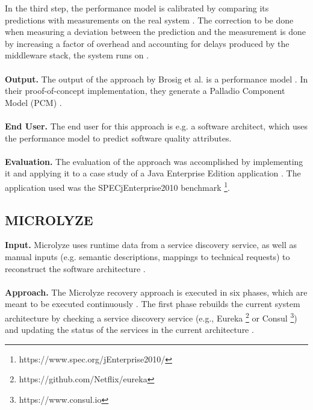 In the third step, the performance model is calibrated by comparing its predictions with measurements on the real system \cite{Brosig2011}.
The correction to be done when measuring a deviation between the prediction and the measurement is done by increasing a factor of overhead and accounting for delays produced by the middleware stack, the system runs on \cite{Brosig2011}.
\\ \\
\textbf{Output.}
The output of the approach by Brosig et al. is a performance model \cite{Brosig2011}.
In their proof-of-concept implementation, they generate a Palladio Component Model (PCM) \cite{Brosig2011}.
\\ \\
\textbf{End User.}
The end user for this approach is e.g. a software architect, which uses the performance model to predict software quality attributes.
\\ \\
\textbf{Evaluation.}
The evaluation of the approach was accomplished by implementing it and applying it to a case study of a Java Enterprise Edition application \cite{Brosig2011}.
The application used was the SPECjEnterprise2010 benchmark \footnote{https://www.spec.org/jEnterprise2010/}.


\subsection{MICROLYZE \cite{Kleehaus2018}}
\label{sec:Results:Microlyze}
\textbf{Input.}
Microlyze uses runtime data from a service discovery service, as well as manual inputs (e.g. semantic descriptions, mappings to technical requests) to reconstruct the software architecture \cite{Kleehaus2018}.
\\ \\
\textbf{Approach.}
The Microlyze recovery approach is executed in six phases, which are meant to be executed continuously \cite{Kleehaus2018}.
The first phase rebuilds the current system architecture by checking a service discovery service (e.g., Eureka \footnote{https://github.com/Netflix/eureka} or Consul \footnote{https://www.consul.io}) and updating the status of the services in the current architecture \cite{Kleehaus2018}.

